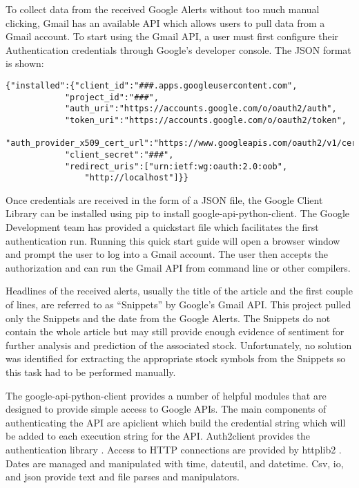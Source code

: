 \documentclass[sigconf]{acmart}
\begin{document}
To collect data from the received Google Alerts without too much manual clicking, Gmail has an available API which allows users to pull data from a Gmail account. To start using the Gmail API, a user must first configure their Authentication credentials through Google's developer console. The JSON format is shown:
\begin{mdframed}[style=default]
\begin{lstlisting}
{"installed":{"client_id":"###.apps.googleusercontent.com",
			"project_id":"###",
			"auth_uri":"https://accounts.google.com/o/oauth2/auth",
			"token_uri":"https://accounts.google.com/o/oauth2/token",
			"auth_provider_x509_cert_url":"https://www.googleapis.com/oauth2/v1/certs",
			"client_secret":"###",
			"redirect_uris":["urn:ietf:wg:oauth:2.0:oob",
				"http://localhost"]}}
\end{lstlisting}
\end{mdframed}
Once credentials are received in the form of a JSON file, the Google Client Library can be installed using pip to install google-api-python-client. The Google Development team has provided a quickstart file which facilitates the first authentication run. Running this quick start guide will open a browser window and prompt the user to log into a Gmail account. The user then accepts the authorization and can run the Gmail API from command line or other compilers. 

 Headlines of the received alerts, usually the title of the article and the first couple of lines, are referred to as ``Snippets'' by Google's Gmail API. This project pulled only the Snippets and the date from the Google Alerts. The Snippets do not contain the whole article but may still provide enough evidence of sentiment for further analysis and prediction of the associated stock. Unfortunately, no solution was identified for extracting the appropriate stock symbols from the Snippets so this task had to be performed manually. 

The google-api-python-client provides a number of helpful modules that are designed to provide simple access to Google APIs. The main components of authenticating the API are apiclient which build the credential string which will be added to each execution string for the API. Auth2client provides the authentication library \cite{www-apiAccess}. Access to HTTP connections are provided by httplib2 \cite{www-http}. Dates are managed and manipulated with time, dateutil, and datetime. Csv, io, and json provide text and file parses and manipulators. 
\end{document}
